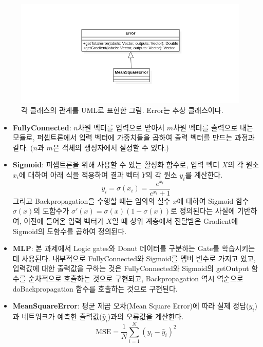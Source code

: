 \documentclass[letterpaper,10pt]{article}
\begin{document}
	\begin{figure}
		\centering
		\includegraphics[width=\linewidth]{images/uml-error.png}
		\caption{각 클래스의 관계를 UML로 표현한 그림. Error는 추상 클래스이다.}
		\label{fig:error}
	\end{figure}

	\begin{itemize}
		\item \textbf{FullyConnected}: $n$차원 벡터를 입력으로 받아서 $m$차원 벡터를 출력으로 내는 모듈로, 퍼셉트론에서 입력 벡터에 가중치들을 곱하여 출력 벡터를 만드는 과정과 같다. ($n$과 $m$은 객체의 생성자에서 설정할 수 있다.)
		
		\item \textbf{Sigmoid}: 퍼셉트론을 위해 사용할 수 있는 활성화 함수로, 입력 벡터 $X$의 각 원소 $x_i$에 대하여 아래 식을 적용하여 결과 벡터 $Y$의 각 원소 $y_i$를 계산한다.\\
		\[
		y_i = \sigma (x_i) = \frac{e^{x_i}}{e^{x_i} + 1}
		\]
		그리고 Backpropagation을 수행할 때는 임의의 실수 $x$에 대하여 Sigmoid 함수 $\sigma(x)$의 도함수가 $\sigma'(x)=\sigma(x)(1-\sigma(x))$로 정의된다는 사실에 기반하여, 이전에 들어온 입력 벡터가 $X$일 때 상위 계층에서 전달받은 Gradient에 Sigmoid의 도함수를 곱하여 정의된다.
		
		\item \textbf{MLP}: 본 과제에서 Logic gates와 Donut 데이터를 구분하는 Gate를 학습시키는데 사용된다. 내부적으로 FullyConnected와 Sigmoid를 멤버 변수로 가지고 있고, 입력값에 대한 출력값을 구하는 것은 FullyConnected와 Sigmoid의 getOutput 함수를 순차적으로 호출하는 것으로 구현되고, Backpropagation 역시 역순으로 doBackpropagation 함수를 호출하는 것으로 구현된다.
		
		\item \textbf{MeanSquareError}: 평균 제곱 오차(Mean Square Error)에 따라 실제 정답($y_i$)과 네트워크가 예측한 출력값($\hat{y}_i$)과의 오류값을 계산한다.\\
		\[
		\text{MSE}=\frac{1}{N}\sum_{i=1}^{N} (y_i-\hat{y}_i)^2
		\]
	\end{itemize}
\end{document}
